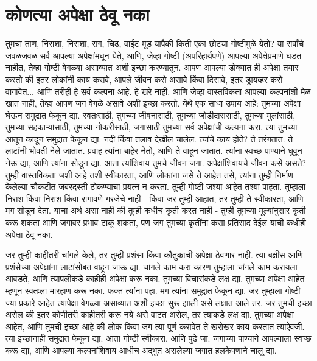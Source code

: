 \chapter{कोणत्या अपेक्षा ठेवू नका}
तुमचा ताण, निराशा, निराशा, राग, चिढ, वाईट मूड यापैकी किती एका छोट्या गोष्टीमुळे येतो?
या सर्वांचे जवळजवळ सर्व आपल्या अपेक्षांमधून येते, आणि, जेव्हा गोष्टी (अपरिहार्यपणे) आपल्या अपेक्षेप्रमाणे घडत नाहीत, तेव्हा गोष्टी वेगळ्या असाव्यात अशी इच्छा करण्यातून.
आपण आपल्या डोक्यात ही अपेक्षा तयार करतो की इतर लोकांनी काय करावे, आपले जीवन कसे असावे किंवा दिसावे, इतर ड्रायव्हर कसे वागावेत... आणि तरीही हे सर्व कल्पना आहे. हे खरे नाही.
आणि जेव्हा वास्तविकता आपल्या कल्पनांशी मेळ खात नाही, तेव्हा आपण जग वेगळे असावे अशी इच्छा करतो.
येथे एक साधा उपाय आहे:
तुमच्या अपेक्षा घेऊन समुद्रात फेकून द्या.
स्वतःसाठी, तुमच्या जीवनासाठी, तुमच्या जोडीदारासाठी, तुमच्या मुलांसाठी, तुमच्या सहकार्‍यांसाठी, तुमच्या नोकरीसाठी, जगासाठी तुमच्या सर्व अपेक्षांची कल्पना करा. त्या तुमच्या आतून काढून समुद्रात फेकून द्या. नदी किंवा तलाव देखील चालेल.
त्यांचे काय होते? ते तरंगतात. ते लाटांनी भोवती नेले जातात. प्रवाह त्यांना बाहेर नेतो, आणि ते वाहून जातात. त्यांना स्वच्छ पाण्याने धुवून नेऊ द्या, आणि त्यांना सोडून द्या.
आता त्यांशिवाय तुमचे जीवन जगा.
अपेक्षांशिवायचे जीवन कसे असते? तुम्ही वास्तविकता जशी आहे तशी स्वीकारता, आणि लोकांना जसे ते आहेत तसे, त्यांना तुम्ही निर्माण केलेल्या चौकटीत जबरदस्ती ठोकण्याचा प्रयत्न न करता. तुम्ही गोष्टी जश्या आहेत तश्या पाहता. तुम्हाला निराश किंवा निराश किंवा रागावणे गरजेचे नाही - किंवा जर तुम्ही आहात, तर तुम्ही ते स्वीकारता, आणि मग सोडून देता.
याचा अर्थ असा नाही की तुम्ही कधीच कृती करत नाही - तुम्ही तुमच्या मूल्यांनुसार कृती करू शकता आणि जगावर प्रभाव टाकू शकता, पण जग तुमच्या कृतींना कसा प्रतिसाद देईल याची कधीही अपेक्षा ठेवू नका.

जर तुम्ही काहीतरी चांगले केले, तर तुम्ही प्रशंसा किंवा कौतुकाची अपेक्षा ठेवणार नाही. त्या बक्षीस आणि प्रशंसेच्या अपेक्षांना लाटांसोबत वाहून जाऊ द्या. चांगले काम करा कारण तुम्हाला चांगले काम करायला आवडते, आणि त्यापलीकडे काहीही अपेक्षा करू नका.
तुमच्या विचारांकडे लक्ष द्या. तुमच्या अपेक्षा आहेत म्हणून स्वतःला मारहाण करू नका. फक्त त्यांना पहा. मग त्यांना समुद्रात फेकून द्या.
जर तुम्हाला गोष्टी ज्या प्रकारे आहेत त्यापेक्षा वेगळ्या असाव्यात अशी इच्छा सुरू झाली असे लक्षात आले तर. जर तुमची इच्छा असेल की इतर कोणीतरी काहीतरी करू नये असे वाटत असेल, तर त्याकडे लक्ष द्या. तुमच्या अपेक्षा आहेत, आणि तुमची इच्छा आहे की लोक किंवा जग त्या पूर्ण करावेत ते खरोखर काय करतात त्याऐवजी. त्या इच्छांनाही समुद्रात फेकून द्या. आता गोष्टी स्वीकारा, आणि पुढे जा.
जगाच्या पाण्याने आपल्याला स्वच्छ करू द्या, आणि आपल्या कल्पनांशिवाय आधीच अद्भुत असलेल्या जगात हलकेपणाने चालू द्या.

